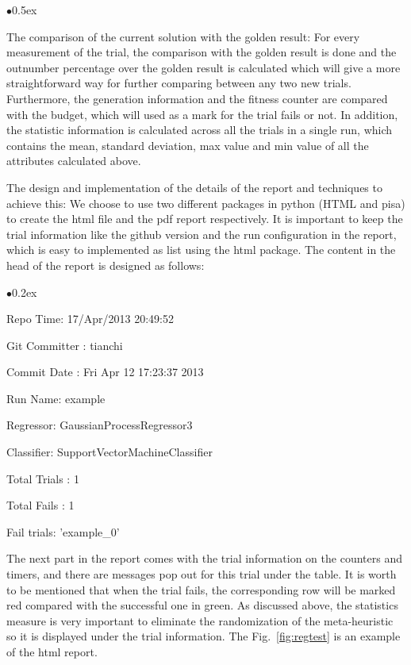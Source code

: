 \documentclass[11pt, runningheads,a4paper]{llncs}
\begin{document}
\begin{list}{$\bullet$}{\itemsep 0.5ex}
\item The comparison of the current solution with the golden result: For every measurement of the trial, the comparison with the golden result is done and the outnumber percentage over the golden result is calculated which will give a more straightforward way for further comparing between any two new trials. Furthermore, the generation information and the fitness counter are compared with the budget, which will used as a mark for the trial fails or not. In addition, the statistic information is calculated across all the trials in a single run, which contains the mean, standard deviation, max value and min value of all the attributes calculated above. 
\item The design and implementation of the details of the report and techniques to achieve this: We choose to use two different packages in python (HTML and pisa) to create the html file and the pdf report respectively. It is important to keep the trial information like the github version and the run configuration in the report, which is easy to implemented as list using the html package. The content in the head of the report is designed as follows:
\begin{list}{$\bullet$}{\itemsep 0.2ex}
\item Repo Time: 17/Apr/2013 20:49:52
\item Git Committer : tianchi
\item Commit Date : Fri Apr 12 17:23:37 2013
\item Run Name: example
\item Regressor: GaussianProcessRegressor3
\item Classifier: SupportVectorMachineClassifier
\item Total Trials : 1
\item Total Fails : 1
\item Fail trials: 'example\_0'
\end{list}
\end{list}
The next part in the report comes with the trial information on the counters and timers, and there are messages pop out for this trial under the table. It is worth to be mentioned that when the trial fails, the corresponding row will be marked red compared with the successful one in green. As discussed above, the statistics measure is very important to eliminate the randomization of the meta-heuristic so it is displayed under the trial information. The Fig.~\ref{fig:regtest} is an example of the html report.
\end{document}
